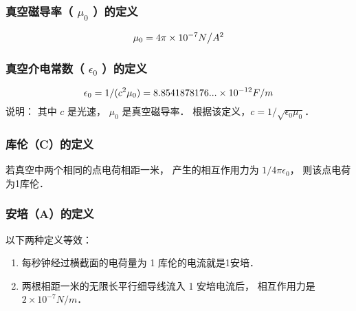 \subsubsection{真空磁导率（ ${\mu _0}$ ）的定义}
  \begin{equation}
{\mu _0} = 4\pi  \times {10^{ - 7}}{N \mathord{\left/
 {\vphantom {N {{A^2}}}} \right.
 \kern-\nulldelimiterspace} {{A^2}}}
\end{equation}

\subsubsection{真空介电常数（ ${\epsilon _0}$ ）的定义}
   \begin{equation}
{\epsilon _0} = 1/({c^2}{\mu _0}) = 8.8541878176... \times {10^{ - 12}}{F \mathord{\left/
 {\vphantom {F m}} \right.
 \kern-\nulldelimiterspace} m}
\end{equation}
说明： 其中 $c$ 是光速， ${\mu _0}$ 是真空磁导率． 根据该定义，$c = 1/\sqrt {{\epsilon _0}{\mu _0}} $．  

\subsubsection{库伦（C）的定义}
若真空中两个相同的点电荷相距一米， 产生的相互作用力为 ${1}/{{4\pi {\epsilon _0}}}$，   则该点电荷为1库伦．

\subsubsection{安培（A）的定义}
以下两种定义等效：
\begin{enumerate}
\item 每秒钟经过横截面的电荷量为 1 库伦的电流就是1安培．
\item 两根相距一米的无限长平行细导线流入 1 安培电流后， 相互作用力是 $2 \times {10^{ - 7}}N/m$． 
\end{enumerate}



